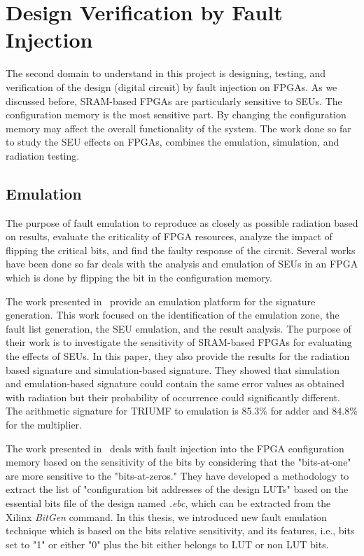 \section{Design Verification by Fault Injection}

The second domain to understand in this project is designing, testing, and verification of the design (digital circuit) by fault injection on FPGAs. As we discussed before, SRAM-based FPGAs are particularly sensitive to SEUs. The configuration memory is the most sensitive part. By changing the configuration memory may affect the overall functionality of the system. The work done so far to study the SEU effects on FPGAs, combines the emulation, simulation, and radiation testing.
\subsection{Emulation}
The purpose of fault emulation to reproduce as closely as possible radiation based on results, evaluate the criticality of FPGA resources, analyze the impact of flipping the critical bits, and find the faulty response of the circuit. Several works have been done so far deals with the analysis and emulation of SEUs in an FPGA which is done by flipping the bit in the configuration memory. 

The work presented in~\cite{hobeika2014multi} provide an emulation platform for the signature generation. This work focused on the identification of the emulation zone, the fault list generation, the SEU emulation, and the result analysis. The purpose of their work is to investigate the sensitivity of SRAM-based FPGAs for evaluating the effects of SEUs. In this paper, they also provide the results for the radiation based signature and simulation-based signature. They showed that simulation and emulation-based signature could contain the same error values as obtained with radiation but their probability of occurrence could significantly different. The arithmetic signature for TRIUMF to emulation is 85.3\% for adder and 84.8\% for the multiplier. 


The work presented in~\citep{souari2015optimization, souari2016towards} deals with fault injection into the FPGA configuration memory based on the sensitivity of the bits by considering that the "bits-at-one" are more sensitive to the "bits-at-zeros." They have developed a methodology to extract the list of "configuration bit addresses of the design LUTs" based on the essential bits file of the design named \textit{.ebc},  which can be extracted from the Xilinx \textit{BitGen} command. In this thesis, we introduced new fault emulation technique which is based on the bits relative sensitivity, and its features, i.e., bits set to "1" or either "0" plus the bit either belongs to LUT or non LUT bits. 

